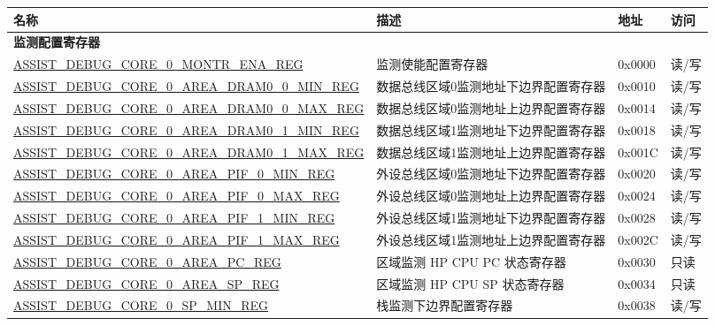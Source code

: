 \begin{longtable}{ | l| m{3.2cm} | l | l | }
\hline\rowcolor{lightgray}
{\bfseries 名称} & {\bfseries 描述} &  {\bfseries 地址} & {\bfseries 访问} \\ \hline
\endhead
\multicolumn{4}{|l|}{\textbf{监测配置寄存器}} \\ \hline
\hyperref[regdesc:ASSISTDEBUGCORE0MONTRENAREG]{ASSIST\_DEBUG\_CORE\_0\_MONTR\_ENA\_REG} & 监测使能配置寄存器 & 0x0000 & 读/写 \\ \hline
\hyperref[regdesc:ASSISTDEBUGCORE0AREADRAM00MINREG]{ASSIST\_DEBUG\_CORE\_0\_AREA\_DRAM0\_0\_MIN\_REG} & 数据总线区域0监测地址下边界配置寄存器 & 0x0010 & 读/写 \\ \hline
\hyperref[regdesc:ASSISTDEBUGCORE0AREADRAM00MAXREG]{ASSIST\_DEBUG\_CORE\_0\_AREA\_DRAM0\_0\_MAX\_REG} & 数据总线区域0监测地址上边界配置寄存器 & 0x0014 & 读/写 \\ \hline
\hyperref[regdesc:ASSISTDEBUGCORE0AREADRAM01MINREG]{ASSIST\_DEBUG\_CORE\_0\_AREA\_DRAM0\_1\_MIN\_REG} & 数据总线区域1监测地址下边界配置寄存器 & 0x0018 & 读/写 \\ \hline
\hyperref[regdesc:ASSISTDEBUGCORE0AREADRAM01MAXREG]{ASSIST\_DEBUG\_CORE\_0\_AREA\_DRAM0\_1\_MAX\_REG} & 数据总线区域1监测地址上边界配置寄存器 & 0x001C & 读/写 \\ \hline
\hyperref[regdesc:ASSISTDEBUGCORE0AREAPIF0MINREG]{ASSIST\_DEBUG\_CORE\_0\_AREA\_PIF\_0\_MIN\_REG} & 外设总线区域0监测地址下边界配置寄存器 & 0x0020 & 读/写 \\ \hline
\hyperref[regdesc:ASSISTDEBUGCORE0AREAPIF0MAXREG]{ASSIST\_DEBUG\_CORE\_0\_AREA\_PIF\_0\_MAX\_REG} & 外设总线区域0监测地址上边界配置寄存器 & 0x0024 & 读/写 \\ \hline
\hyperref[regdesc:ASSISTDEBUGCORE0AREAPIF1MINREG]{ASSIST\_DEBUG\_CORE\_0\_AREA\_PIF\_1\_MIN\_REG} & 外设总线区域1监测地址下边界配置寄存器 & 0x0028 & 读/写 \\ \hline
\hyperref[regdesc:ASSISTDEBUGCORE0AREAPIF1MAXREG]{ASSIST\_DEBUG\_CORE\_0\_AREA\_PIF\_1\_MAX\_REG} & 外设总线区域1监测地址上边界配置寄存器 & 0x002C & 读/写 \\ \hline
\hyperref[regdesc:ASSISTDEBUGCORE0AREAPCREG]{ASSIST\_DEBUG\_CORE\_0\_AREA\_PC\_REG} & 区域监测 HP CPU PC 状态寄存器 & 0x0030 & 只读 \\ \hline
\hyperref[regdesc:ASSISTDEBUGCORE0AREASPREG]{ASSIST\_DEBUG\_CORE\_0\_AREA\_SP\_REG} & 区域监测 HP CPU SP 状态寄存器 & 0x0034 & 只读 \\ \hline
\hyperref[regdesc:ASSISTDEBUGCORE0SPMINREG]{ASSIST\_DEBUG\_CORE\_0\_SP\_MIN\_REG} & 栈监测下边界配置寄存器 & 0x0038 &读/写 \\ \hline

\end{longtable}
